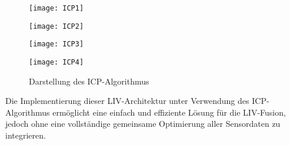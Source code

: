 \begin{figure}[h]
    \centering
    \begin{minipage}{0.24\textwidth}
        \centering
        \texttt{[image: ICP1]}
    \end{minipage}
    \hfill
    \begin{minipage}{0.24\textwidth}
        \centering
        \texttt{[image: ICP2]}
    \end{minipage}
    \hfill
    \begin{minipage}{0.24\textwidth}
        \centering
        \texttt{[image: ICP3]}
    \end{minipage}
    \hfill
    \begin{minipage}{0.24\textwidth}
        \centering
        \texttt{[image: ICP4]}
    \end{minipage}
    \caption{Darstellung des ICP-Algorithmus \cite{bogoslavskyi2017icp}}
    \label{fig:ICP}
\end{figure}

Die Implementierung dieser LIV-Architektur unter Verwendung des ICP-Algorithmus ermöglicht eine einfach und effiziente Lösung für die LIV-Fusion, jedoch ohne eine vollständige gemeinsame Optimierung aller Sensordaten zu integrieren. \cite{zhang2024lidarslam}